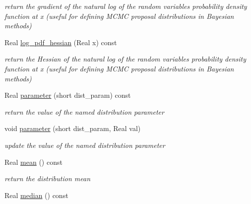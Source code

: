 \begin{DoxyCompactItemize}
\begin{DoxyCompactList}\small\item\em return the gradient of the natural log of the random variable\textquotesingle{}s probability density function at x (useful for defining M\+C\+MC proposal distributions in Bayesian methods) \end{DoxyCompactList}\item 
Real \hyperlink{classPecos_1_1BoundedLognormalRandomVariable_a7b43f26f0f2bcdfef15d87e1f9399b33}{log\+\_\+pdf\+\_\+hessian} (Real x) const \label{classPecos_1_1BoundedLognormalRandomVariable_a7b43f26f0f2bcdfef15d87e1f9399b33}

\begin{DoxyCompactList}\small\item\em return the Hessian of the natural log of the random variable\textquotesingle{}s probability density function at x (useful for defining M\+C\+MC proposal distributions in Bayesian methods) \end{DoxyCompactList}\item 
Real \hyperlink{classPecos_1_1BoundedLognormalRandomVariable_aa891dab1ae9a225f493e3a0e5032b778}{parameter} (short dist\+\_\+param) const \label{classPecos_1_1BoundedLognormalRandomVariable_aa891dab1ae9a225f493e3a0e5032b778}

\begin{DoxyCompactList}\small\item\em return the value of the named distribution parameter \end{DoxyCompactList}\item 
void \hyperlink{classPecos_1_1BoundedLognormalRandomVariable_ae8e123224f588aee676d5d56d5ca900d}{parameter} (short dist\+\_\+param, Real val)\label{classPecos_1_1BoundedLognormalRandomVariable_ae8e123224f588aee676d5d56d5ca900d}

\begin{DoxyCompactList}\small\item\em update the value of the named distribution parameter \end{DoxyCompactList}\item 
Real \hyperlink{classPecos_1_1BoundedLognormalRandomVariable_a962ffe5a3593be370d5c883365c060f4}{mean} () const \label{classPecos_1_1BoundedLognormalRandomVariable_a962ffe5a3593be370d5c883365c060f4}

\begin{DoxyCompactList}\small\item\em return the distribution mean \end{DoxyCompactList}\item 
Real \hyperlink{classPecos_1_1BoundedLognormalRandomVariable_ae1fff19ce29a79d657043a598523635d}{median} () const \label{classPecos_1_1BoundedLognormalRandomVariable_ae1fff19ce29a79d657043a598523635d}


\end{DoxyCompactItemize}
